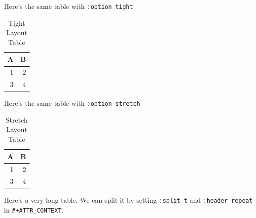 \documentclass[11pt]{article}
\begin{document}
Here's the same table with \texttt{:option tight}

\begin{table}[htbp]
\caption{Tight Layout Table}
\centering
\begin{tabular}{rr}
A & B\\
\hline
1 & 2\\
3 & 4\\
\end{tabular}
\end{table}


Here's the same table with \texttt{:option stretch}

\begin{table}[htbp]
\caption{Stretch Layout Table}
\centering
\begin{tabular}{rr}
A & B\\
\hline
1 & 2\\
3 & 4\\
\end{tabular}
\end{table}


Here's a very long table. We can split it by setting
\texttt{:split t} and \texttt{:header repeat} in \texttt{\#+ATTR\_CONTEXT}.
\end{document}

